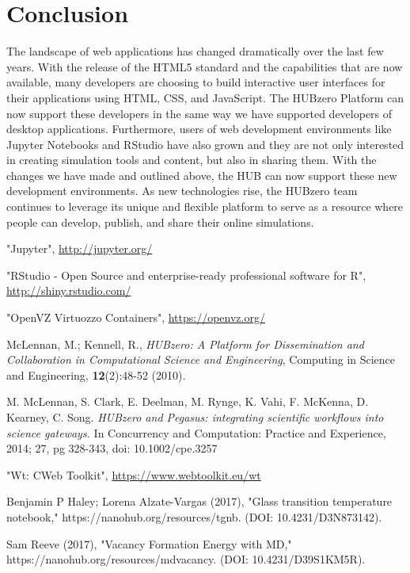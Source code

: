 \documentclass[conference]{../sty/IEEEtran}
\newcommand\CC{C\nolinebreak[4]\hspace{-.05em}\raisebox{.4ex}{\relsize{-3}{\textbf{++}}}\hspace{.25em}}
\begin{document}
\section{Conclusion}
The landscape of web applications has changed dramatically over the last few
years. With the release of the HTML5 standard and the capabilities that are now
available, many developers are choosing to build interactive user interfaces
for their applications using HTML, CSS, and JavaScript. The HUBzero Platform
can now support these developers in the same way we have supported developers of
desktop applications. Furthermore, users of web development environments
like Jupyter Notebooks and RStudio have also grown and they are not only
interested in creating simulation tools and content, but also in sharing them.
With the changes we have made and outlined above, the HUB can now support these
new development environments.  As new technologies rise, the HUBzero team
continues to leverage its unique and flexible platform to serve as a resource
where people can develop, publish, and share their online simulations.




\begin{thebibliography}{1}

"Jupyter", \url{http://jupyter.org/}

"RStudio - Open Source and enterprise-ready professional software for R", \url{http://shiny.rstudio.com/}

"OpenVZ Virtuozzo Containers", \url{https://openvz.org/}

McLennan, M.; Kennell, R., \emph{HUBzero: A Platform for Dissemination
and Collaboration in Computational Science and Engineering}, Computing
in Science and Engineering, \textbf{12}(2):48-52 (2010).

M. McLennan, S. Clark, E. Deelman, M. Rynge, K. Vahi, F.
McKenna, D. Kearney, C. Song. \emph{HUBzero and Pegasus:
integrating scientific workflows into science gateways.} In
Concurrency and Computation: Practice and Experience,
2014; 27, pg 328-343, doi: 10.1002/cpe.3257

"Wt: \CC Web Toolkit", \url{https://www.webtoolkit.eu/wt}

Benjamin P Haley; Lorena Alzate-Vargas (2017), "Glass transition temperature notebook," https://nanohub.org/resources/tgnb. (DOI: 10.4231/D3N873142).

Sam Reeve (2017), "Vacancy Formation Energy with MD," https://nanohub.org/resources/mdvacancy. (DOI: 10.4231/D39S1KM5R).

\end{thebibliography}
\end{document}
